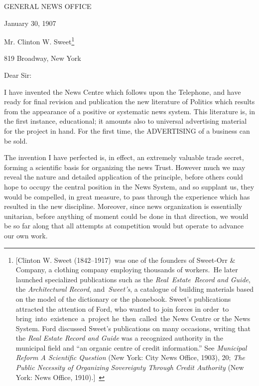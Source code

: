 \documentclass[twoside,symmetric,nobib,justified]{tufte-book}
\begin{document}
\begin{center}

\Large{GENERAL NEWS OFFICE~}

\end{center}

\hfill January 30, 1907

\vspace{0.2in}

\noindent Mr. Clinton W. Sweet\footnote{{[}Clinton W. Sweet (1842--1917)~was one
  of the founders of Sweet-Orr \& Company, a clothing company employing
  thousands of workers.~He later launched specialized publications such
  as the \emph{Real~Estate~Record and Guide}, the \emph{Architectural
  Record}, and~\emph{Sweet's}, a catalogue of building materials based
  on the model of the dictionary or the phonebook. Sweet's publications
  attracted the attention of Ford, who wanted to join forces in order~to
  bring~into~existence~a~project he~then~called~the News Centre or the
  News System. Ford discussed Sweet's publications on many occasions,
  writing that the \emph{Real Estate Record and Guide} was a recognized
  authority in the municipal field and ``an organic centre of credit
  information.'' See \emph{Municipal Reform A Scientific Question} (New
  York: City News Office, 1903), 20; \emph{The Public Necessity of
  Organizing Sovereignty Through Credit Authority} (New York: News
  Office, 1910).{]}~}

819 Broadway, New York~~

\vspace{0.2in}

\noindent Dear Sir:~

I have invented the News Centre which follows upon the Telephone, and
have ready for final revision and publication the new literature of
Politics which results from the appearance of a positive or systematic
news system. This literature is, in the first instance, educational; it
amounts also to universal advertising material for the project in hand.
For the first time, the ADVERTISING of a business can be sold.~

The invention I have perfected is, in effect, an extremely valuable
trade secret, forming a scientific basis for organizing the news Trust.
However much we may reveal the nature and detailed application of the
principle, before others could hope to occupy the central position in
the News System, and so supplant us, they would be compelled, in great
measure, to pass through the experience which has resulted in the new
discipline. Moreover, since news organization is essentially unitarian,
before anything of moment could be done in that direction, we would be
so far along that all attempts at competition would but operate to
advance our own work.~
\end{document}
